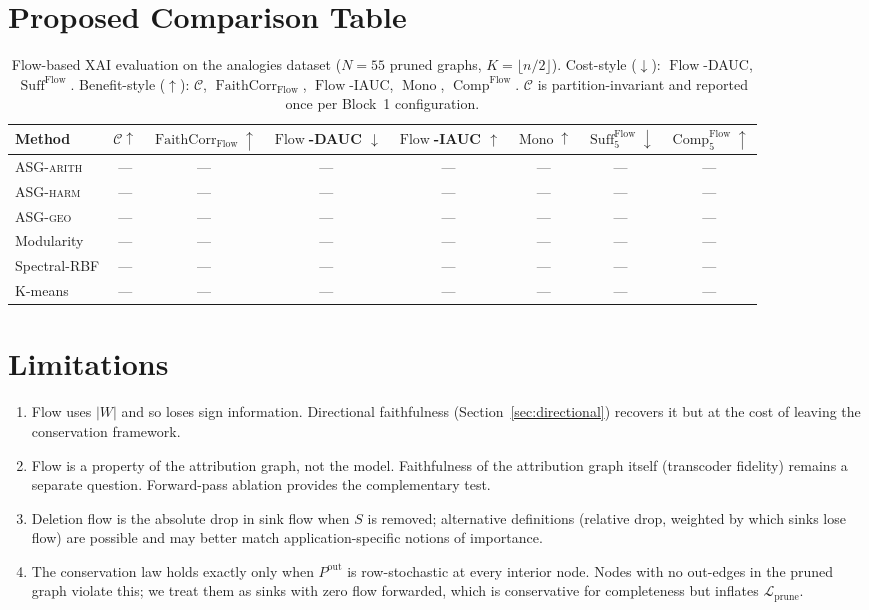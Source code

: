 \documentclass[11pt]{article}
\DeclareMathOperator{\Flow}{Flow}
\DeclareMathOperator{\Suff}{Suff}
\DeclareMathOperator{\Comp}{Comp}
\DeclareMathOperator{\Mono}{Mono}
\DeclareMathOperator{\FaithCorr}{FaithCorr}
\begin{document}
\section{Proposed Comparison Table}\label{sec:proposed-table}

\begin{table}[h]
\centering
\caption{Flow-based XAI evaluation on the analogies dataset
($N = 55$ pruned graphs, $K = \lfloor n/2 \rfloor$). Cost-style
($\downarrow$): $\Flow$-DAUC, $\Suff^{\Flow}$. Benefit-style
($\uparrow$): $\mathcal{C}$, $\FaithCorr_{\Flow}$,
$\Flow$-IAUC, $\Mono$, $\Comp^{\Flow}$.
$\mathcal{C}$ is partition-invariant and reported once per Block~1
configuration.}
\label{tab:flow-xai}
\small
\begin{tabular}{@{}lccccccc@{}}
\toprule
\textbf{Method} &
$\mathcal{C} \uparrow$ &
$\FaithCorr_{\Flow} \uparrow$ &
$\Flow$-DAUC $\downarrow$ &
$\Flow$-IAUC $\uparrow$ &
$\Mono \uparrow$ &
$\Suff_5^{\Flow} \downarrow$ &
$\Comp_5^{\Flow} \uparrow$ \\
\midrule
\textsc{ASG-arith} & --- & --- & --- & --- & --- & --- & --- \\
\textsc{ASG-harm}  & --- & --- & --- & --- & --- & --- & --- \\
\textsc{ASG-geo}   & --- & --- & --- & --- & --- & --- & --- \\
Modularity         & --- & --- & --- & --- & --- & --- & --- \\
Spectral-RBF       & --- & --- & --- & --- & --- & --- & --- \\
K-means            & --- & --- & --- & --- & --- & --- & --- \\
\bottomrule
\end{tabular}
\end{table}

\section{Limitations}\label{sec:limitations}

\begin{enumerate}[leftmargin=*,topsep=2pt,itemsep=1pt]
\item Flow uses $|W|$ and so loses sign information. Directional
faithfulness (Section~\ref{sec:directional}) recovers it but at
the cost of leaving the conservation framework.
\item Flow is a property of the attribution graph, not the model.
Faithfulness of the attribution graph itself (transcoder fidelity)
remains a separate question. Forward-pass ablation provides the
complementary test.
\item Deletion flow is the absolute drop in sink flow when $S$ is
removed; alternative definitions (relative drop, weighted by which
sinks lose flow) are possible and may better match
application-specific notions of importance.
\item The conservation law holds exactly only when
$P^{\text{out}}$ is row-stochastic at every interior node. Nodes
with no out-edges in the pruned graph violate this; we treat them
as sinks with zero flow forwarded, which is conservative for
completeness but inflates $\mathcal{L}_{\text{prune}}$.
\end{enumerate}
\end{document}
